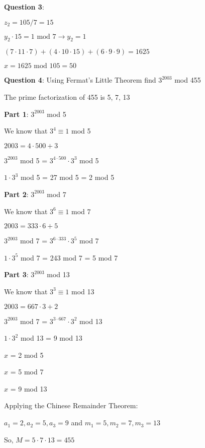 \documentclass{article} %
\newcommand{\question}[2][]{\begin{flushleft}
        \textbf{Question #1}: #2

\end{flushleft}}
\begin{document}
    \newpage

    \question[3]{}

    $z_2 = 105 / 7 = 15$

    $y_2 \cdot 15 = 1 \text{ mod } 7 \rightarrow y_2 = 1$ 

    $(7 \cdot 11 \cdot 7) + (4 \cdot 10 \cdot 15) + (6 \cdot 9 \cdot 9) = 1625$

    $x = 1625 \text{ mod } 105 = 50$

    \question[4]{Using Fermat's Little Theorem find $3^{2003}$ mod 455}

    The prime factorization of 455 is 5, 7, 13

    \textbf{Part 1}: $3^{2003}$ mod 5

    \tabto{1cm} We know that $3^4 \equiv 1$ mod 5

    \tabto{1cm} $2003 = 4 \cdot 500 + 3$

    \tabto{1cm} $3^{2003}$ mod 5 = $3^{4 \cdot 500} \cdot 3^{3}$ mod 5

    \tabto{1cm} $1 \cdot 3^{3}$ mod 5 = 27 mod 5 = 2 mod 5

    \textbf{Part 2}: $3^{2003}$ mod 7

    \tabto{1cm} We know that $3^6 \equiv 1$ mod 7

    \tabto{1cm} $2003 = 333 \cdot 6 + 5$

    \tabto{1cm} $3^{2003}$ mod 7 = $3^{6 \cdot 333} \cdot 3^{5}$ mod 7

    \tabto{1cm} $1 \cdot 3^{5}$ mod 7 = 243 mod 7 = 5 mod 7

    \textbf{Part 3}: $3^{2003}$ mod 13

    \tabto{1cm} We know that $3^3 \equiv 1$ mod 13

    \tabto{1cm} $2003 = 667 \cdot 3 + 2$

    \tabto{1cm} $3^{2003}$ mod 7 = $3^{3 \cdot 667} \cdot 3^{2}$ mod 13

    \tabto{1cm} $1 \cdot 3^{2}$ mod 13 = 9 mod 13

    \vspace*{0.1cm}

    $x$ = 2 mod 5

    $x$ = 5 mod 7

    $x$ = 9 mod 13

    Applying the Chinese Remainder Theorem:

    $a_1 = 2, a_2 = 5, a_3 = 9$ and $m_1 = 5, m_2 = 7, m_3 = 13$

    So, $M = 5 \cdot 7 \cdot 13 = 455$
\end{document}
